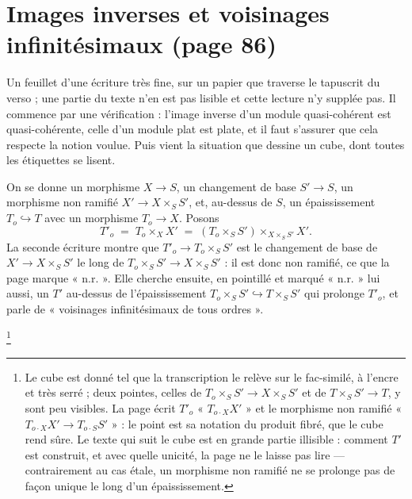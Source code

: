 \documentclass[11pt,a4paper]{article}
\begin{document}
\section*{Images inverses et voisinages infinitésimaux (page 86)}

Un feuillet d'une écriture très fine, sur un papier que traverse le tapuscrit
du verso ; une partie du texte n'en est pas lisible et cette lecture n'y
supplée pas. Il commence par une vérification : l'image inverse d'un module
quasi-cohérent est quasi-cohérente, celle d'un module plat est plate, et il
faut s'assurer que cela respecte la notion voulue. Puis vient la situation que
dessine un cube, dont toutes les étiquettes se lisent.

On se donne un morphisme $X \to S$, un changement de base $S' \to S$, un
morphisme non ramifié $X' \to X \times_{S} S'$, et, au-dessus de $S$, un
épaississement $T_{o} \hookrightarrow T$ avec un morphisme $T_{o} \to X$. Posons
\[
  T'_{o} \;=\; T_{o} \times_{X} X' \;=\; (T_{o} \times_{S} S')
  \times_{X \times_{S} S'} X' .
\]
La seconde écriture montre que $T'_{o} \to T_{o} \times_{S} S'$ est le
changement de base de $X' \to X \times_{S} S'$ le long de
$T_{o} \times_{S} S' \to X \times_{S} S'$ : il est donc non ramifié, ce que la
page marque « n.r. ». Elle cherche ensuite, en pointillé et marqué « n.r. »
lui aussi, un $T'$ au-dessus de l'épaississement $T_{o} \times_{S} S'
\hookrightarrow T \times_{S} S'$ qui prolonge $T'_{o}$, et parle de
« voisinages infinitésimaux de tous ordres ».


\footnote{Le cube est donné tel que la transcription le relève sur le
fac-similé, à l'encre et très serré ; deux pointes, celles de
$T_{o} \times_{S} S' \to X \times_{S} S'$ et de $T \times_{S} S' \to T$, y sont
peu visibles. La page écrit $T'_{o}$ « $T_{o \cdot X} X'$ » et le morphisme
non ramifié « $T_{o \cdot X} X' \to T_{o \cdot S} S'$ » : le point est sa
notation du produit fibré, que le cube rend sûre. Le texte qui suit le cube est en grande
partie illisible : comment $T'$ est construit, et avec quelle unicité, la page
ne le laisse pas lire --- contrairement au cas étale, un morphisme non ramifié
ne se prolonge pas de façon unique le long d'un épaississement.}
\end{document}
